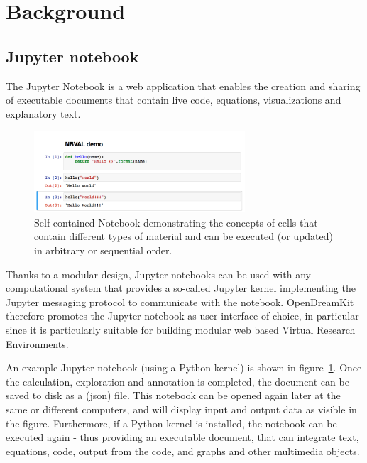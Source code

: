 \documentclass{deliverablereport}
\author{Martin Sandve Aln\ae{}s \& Hans Fangohr \& Vidar Fauske \& Thomas Kluyver \& Benjamin Ragan-Kelley \& MORE?}
\begin{document}
\maketitle
%
\strut\githubissuedescription
\newpage\tableofcontents\newpage

\newcommand{\nbval}{\texttt{nbval} }

\section{Background} %

\subsection{Jupyter notebook}
The Jupyter Notebook is a web application that enables the creation
and sharing of executable documents that contain live code,
equations, visualizations and explanatory text.


\begin{figure}
\centerline{\includegraphics[width=0.7\textwidth]{examples/demo.png}}
\caption{\label{fig:jupyterdemo} Self-contained \Jupyter Notebook
  demonstrating the concepts of cells that contain different types of
  material and can be executed (or updated) in arbitrary or sequential
  order.}
\end{figure}

Thanks to a modular design, Jupyter notebooks can be used with any
computational system that provides a so-called Jupyter kernel
implementing the Jupyter messaging protocol to communicate with the
notebook. OpenDreamKit therefore promotes the Jupyter notebook as user
interface of choice, in particular since it is particularly suitable
for building modular web based Virtual Research Environments.

An example Jupyter notebook (using a Python kernel) is shown in
figure~\ref{fig:jupyterdemo}. Once the calculation, exploration and
annotation is completed, the document can be saved to disk as a (json)
file. This notebook can be opened again later at the same or different
computers, and will display input and output data as visible in the
figure. Furthermore, if a Python kernel is installed, the notebook can
be executed again  - thus providing an executable document, that
can integrate text, equations, code, output from the code, and graphs and
other multimedia objects.
\end{document}
